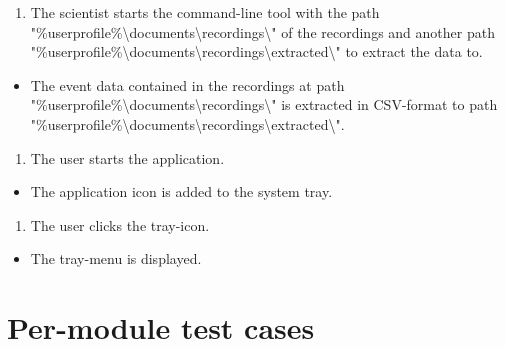 \begin{tests}
    {\begin{enumerate}
        \item The \gls{scientist} starts the command-line tool with the path "\%userprofile\%\textbackslash documents\textbackslash recordings\textbackslash" of the recordings and another path "\%userprofile\%\textbackslash documents\textbackslash recordings\textbackslash extracted\textbackslash" to extract the data to.
    \end{enumerate}}
    {\begin{itemize}
        \item The \gls{event} data contained in the recordings at path "\%userprofile\%\textbackslash documents\textbackslash recordings\textbackslash" is extracted in CSV-format to path "\%userprofile\%\textbackslash documents\textbackslash recordings\textbackslash extracted\textbackslash".
    \end{itemize}}

    {\begin{enumerate}
        \item The \gls{user} starts the application.
    \end{enumerate}}
    {\begin{itemize}
        \item The application icon is added to the system tray.
    \end{itemize}}

    {\begin{enumerate}
        \item The \gls{user} clicks the tray-icon.
    \end{enumerate}}
    {\begin{itemize}
        \item The tray-menu is displayed.
    \end{itemize}}
\end{tests}

\newpage
\section{Per-module test cases}

